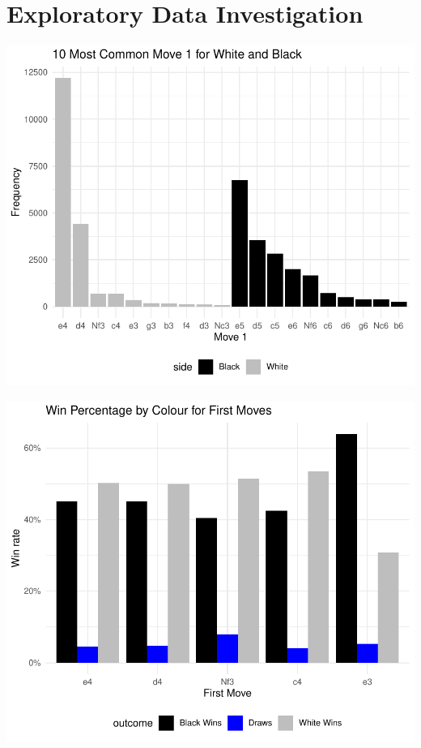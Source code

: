 \documentclass[11pt,preprint, authoryear]{elsarticle}
\numberwithin{equation}{section}
\numberwithin{figure}{section}
\numberwithin{table}{section}
\begin{document}
\hypertarget{exploratory-data-investigation}{%
\section{Exploratory Data
Investigation}\label{exploratory-data-investigation}}

\includegraphics{WriteUp_files/figure-latex/commonmoves-1.pdf}

\includegraphics{WriteUp_files/figure-latex/winsbyfirstmove-1.pdf}
\end{document}
